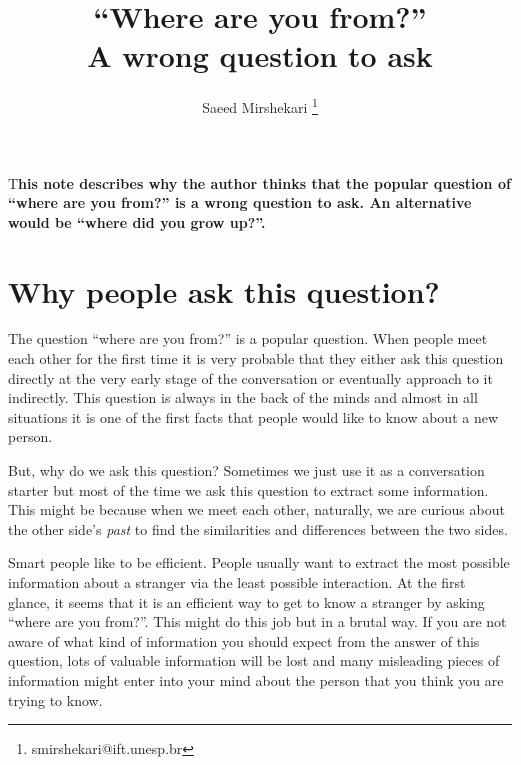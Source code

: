 \documentclass[DIV=calc, paper=a4, fontsize=11pt, twocolumn]{scrartcl}	 %
\title{``Where are you from?''\\ A wrong question to ask} %
\author{Saeed Mirshekari \thanks{smirshekari@ift.unesp.br}\; } %
\date{} %
\newcommand{\initial}[1]{ %
\lettrine[lines=3,lhang=0.3,nindent=0em]{
\color{DarkGoldenrod}
{\textsf{#1}}}{}}
\begin{document}
\maketitle %

\thispagestyle{fancy} %


\initial{T}\textbf{his note describes why the author thinks that the popular question of ``where are you from?'' is a wrong question to ask. An alternative would be ``where did you grow up?''.}


\section*{Why people ask this question?}

The question ``where are you from?'' is a popular question. When people meet each other for the first time it is very probable that they either ask this question directly at the very early stage of the conversation or eventually approach to it indirectly. This question is always in the back of the minds and almost in all situations it is one of the first facts that people would like to know about a new person.

But, why do we ask this question? Sometimes we just use it as a conversation starter but most of the time we ask this question to extract some information. This might be because when we meet each other, naturally, we are curious about the other side's \emph{past} to find the similarities and differences between the two sides.

Smart people like to be efficient. People usually want to extract the most possible information about a stranger via the least possible interaction.  At the first glance, it seems that it is an efficient way to get to know a stranger by asking ``where are you from?''. This might do this job but in a brutal way. If you are not aware of what kind of information you should expect from the answer of this question, lots of valuable information will be lost and many misleading pieces of information might enter into your mind about the person that you think you are trying to know.
\end{document}
